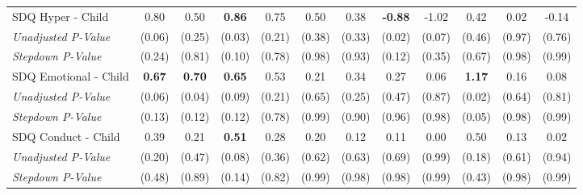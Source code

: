 \begin{tabular}{l c c c c c c c c c c c}
SDQ Hyper - Child & 0.80 & 0.50 & \textbf{ 0.86 } & 0.75 & 0.50 & 0.38 & \textbf{ -0.88 } & -1.02 & 0.42 & 0.02 & -0.14 \\
\quad \textit{Unadjusted P-Value} & (0.06) & (0.25) & (0.03) & (0.21) & (0.38) & (0.33) & (0.02) & (0.07) & (0.46) & (0.97) & (0.76) \\
\quad \textit{Stepdown P-Value} & (0.24) & (0.81) & (0.10) & (0.78) & (0.98) & (0.93) & (0.12) & (0.35) & (0.67) & (0.98) & (0.99) \\
SDQ Emotional - Child & \textbf{ 0.67 } & \textbf{ 0.70 } & \textbf{ 0.65 } & 0.53 & 0.21 & 0.34 & 0.27 & 0.06 & \textbf{ 1.17 } & 0.16 & 0.08 \\
\quad \textit{Unadjusted P-Value} & (0.06) & (0.04) & (0.09) & (0.21) & (0.65) & (0.25) & (0.47) & (0.87) & (0.02) & (0.64) & (0.81) \\
\quad \textit{Stepdown P-Value} & (0.13) & (0.12) & (0.12) & (0.78) & (0.99) & (0.90) & (0.96) & (0.98) & (0.05) & (0.98) & (0.99) \\
SDQ Conduct - Child & 0.39 & 0.21 & \textbf{ 0.51 } & 0.28 & 0.20 & 0.12 & 0.11 & 0.00 & 0.50 & 0.13 & 0.02 \\
\quad \textit{Unadjusted P-Value} & (0.20) & (0.47) & (0.08) & (0.36) & (0.62) & (0.63) & (0.69) & (0.99) & (0.18) & (0.61) & (0.94) \\
\quad \textit{Stepdown P-Value} & (0.48) & (0.89) & (0.14) & (0.82) & (0.99) & (0.98) & (0.98) & (0.99) & (0.43) & (0.98) & (0.99) \\
\bottomrule
\end{tabular}
